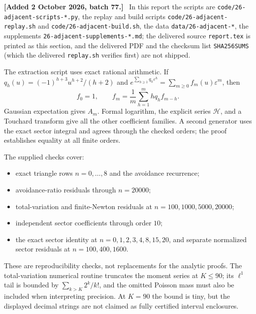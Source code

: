 \documentclass[11pt,letterpaper]{article}
\theoremstyle{remark}\newtheorem{remark}[theorem]{Remark}
\newcommand{\eps}{\varepsilon}\newcommand{\Pois}{\operatorname{Poisson}}
\newenvironment{mergenote}[1][2 October 2026, batch 77]{\par\smallskip\begingroup\small\noindent\textbf{[Added #1.]}\ }{\endgroup\par\smallskip}
\begin{document}
\begin{mergenote}
In this report the scripts are \texttt{code/26-adjacent-scripts-*.py}, the replay and build scripts \texttt{code/26-adjacent-replay.sh} and \texttt{code/26-adjacent-build.sh}, the data \texttt{data/26-adjacent-*}, the supplements \texttt{26-adjacent-supplements-*.md}; the delivered source \texttt{report.tex} is printed as this section, and the delivered PDF and the checksum list \texttt{SHA256SUMS} (which the delivered \texttt{replay.sh} verifies first) are not shipped.
\end{mergenote}

The extraction script uses exact rational arithmetic. If $q_h(u)=(-1)^{h+3}u^{h+2}/(h+2)$ and
$e^{\sum_{h\ge1}q_h \eps^h}=\sum_{m\ge0}f_m(u)\eps^m$, then
\[
 f_0=1,\qquad f_m=\frac1m\sum_{h=1}^mhq_hf_{m-h}.
\]
Gaussian expectation gives $A_m$. Formal logarithm, the explicit series $\mathcal H$, and a Touchard transform give all the other coefficient families. A second generator uses the exact sector integral and agrees through the checked orders; the proof establishes equality at all finite orders.

The supplied checks cover:
\begin{itemize}
 \item exact triangle rows $n=0,\ldots,8$ and the avoidance recurrence;
 \item avoidance-ratio residuals through $n=20000$;
 \item total-variation and finite-Newton residuals at $n=100,1000,5000,20000$;
 \item independent sector coefficients through order $10$;
 \item the exact sector identity at $n=0,1,2,3,4,8,15,20$, and separate normalized sector residuals at $n=100,400,1600$.
\end{itemize}
These are reproducibility checks, not replacements for the analytic proofs. The total-variation numerical routine truncates the moment series at $K\le90$; its $\ell^1$ tail is bounded by $\sum_{k>K}2^k/k!$, and the omitted Poisson mass must also be included when interpreting precision. At $K=90$ the bound is tiny, but the displayed decimal strings are not claimed as fully certified interval enclosures.
\end{document}
